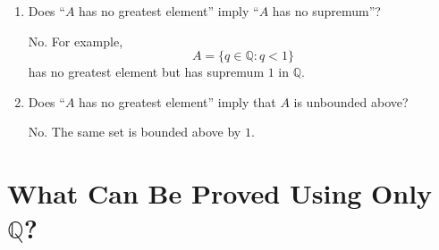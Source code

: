 \documentclass{essay}
\begin{document}
\begin{enumerate}[label=\arabic*., itemsep=10pt]
\begin{answer}
If $\mathbb{R}$ is being constructed from cuts, using completeness of $\mathbb{R}$ to define or justify the cuts assumes the object being constructed.
\end{answer}

\item Does ``$A$ has no greatest element'' imply ``$A$ has no supremum''?

\begin{answer}
No. For example,
\[
A=\{q\in\mathbb{Q}:q<1\}
\]
has no greatest element but has supremum $1$ in $\mathbb{Q}$.
\end{answer}

\item Does ``$A$ has no greatest element'' imply that $A$ is unbounded above?

\begin{answer}
No. The same set is bounded above by $1$.
\end{answer}

\end{enumerate}

\section{What Can Be Proved Using Only \texorpdfstring{$\mathbb{Q}$}{Q}?}
\end{document}
